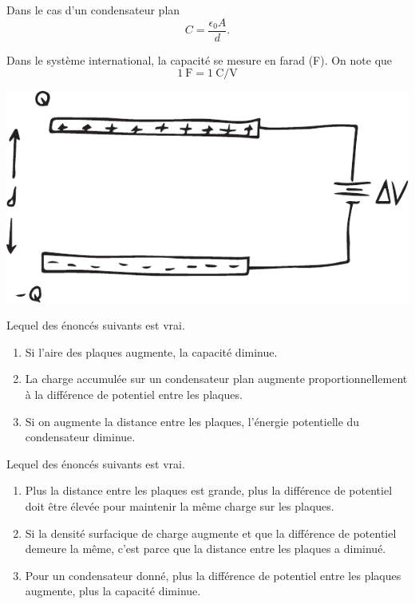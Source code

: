 Dans le cas d'un condensateur plan
$$C = \frac{\epsilon_0 A}{d}.$$

Dans le système international, la capacité se mesure en farad (F). On note que
$$\SI{1}{\farad} = \SI{1}{\coulomb\per\volt}$$

\begin{center}
  \includegraphics[scale=0.5]{05-condensateurs/figures/condensateur-plan.pdf}
\end{center}



\begin{diapobox}
Lequel des énoncés suivants est vrai.

\begin{enumerate}
  \item Si l'aire des plaques augmente, la capacité diminue.
  \item La charge accumulée sur un condensateur plan augmente
    proportionnellement à la différence de potentiel entre les plaques.
  \item Si on augmente la distance entre les plaques, l'énergie potentielle du
    condensateur diminue.
\end{enumerate}


Lequel des énoncés suivants est vrai.

\begin{enumerate}
  \item Plus la distance entre les plaques est grande, plus la différence de
    potentiel doit être élevée pour maintenir la même charge sur les plaques.
  \item Si la densité surfacique de charge augmente et que la différence de
    potentiel demeure la même, c'est parce que la distance entre les plaques a
    diminué.
  \item Pour un condensateur donné, plus la différence de potentiel entre les
    plaques augmente, plus la capacité diminue.
\end{enumerate}

\end{diapobox}



